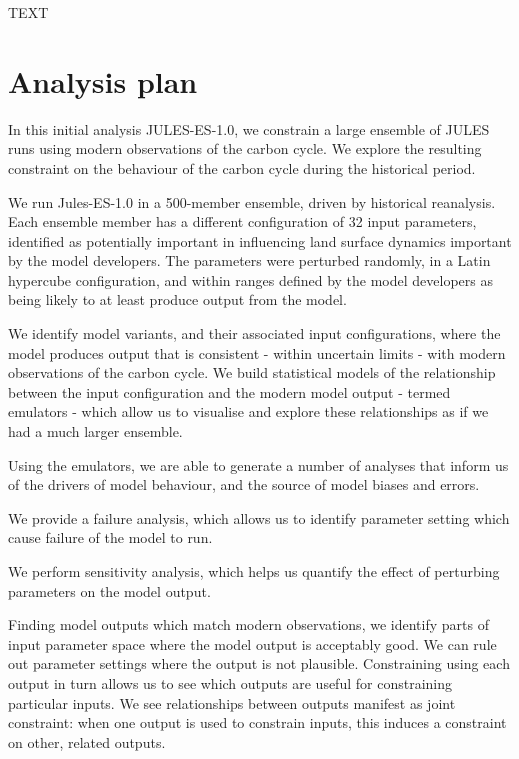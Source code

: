 \documentclass[gmd, manuscript]{copernicus}
\begin{document}
\introduction  %
TEXT


\section{Analysis plan}

In this initial analysis JULES-ES-1.0, we constrain a large ensemble of JULES runs using modern observations of the carbon cycle. We explore the resulting constraint on the behaviour of the carbon cycle during the historical period.

We run Jules-ES-1.0 in a 500-member ensemble, driven by historical reanalysis. Each ensemble member has a different configuration of 32 input parameters, identified as potentially important in influencing land surface dynamics important by the  model developers. The parameters were perturbed randomly, in a Latin hypercube configuration, and within ranges defined by the model developers as being likely to at least produce output from the model.

We identify model variants, and their associated input configurations, where the model produces output that is consistent - within uncertain limits - with modern observations of the carbon cycle. We build statistical models of the relationship between the input configuration and the modern model output - termed emulators - which allow us to visualise and explore these relationships as if we had a much larger ensemble.

Using the emulators, we are able to generate a number of analyses that inform us of the drivers of model behaviour, and the source of model biases and errors.

We provide a failure analysis, which allows us to identify parameter setting which cause failure of the model to run.

We perform sensitivity analysis, which helps us quantify the effect of perturbing parameters on the model output.

Finding model outputs which match modern observations, we identify parts of input parameter space where the model output is acceptably good. We can rule out parameter settings where the output is not plausible. Constraining using each output in turn allows us to see which outputs are useful for constraining particular inputs. We see relationships between outputs manifest as joint constraint: when one output is used to constrain inputs, this induces a constraint on other, related outputs.
\end{document}
